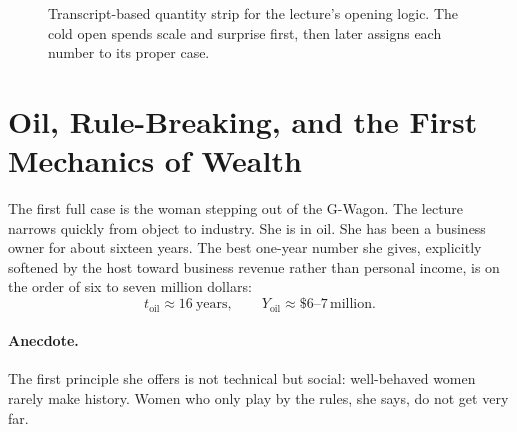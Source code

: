 \begin{figure}[h]
\centering
{}
\caption{Transcript-based quantity strip for the lecture's opening logic. The cold open spends scale and surprise first, then later assigns each number to its proper case.}
\end{figure}

\section{Oil, Rule-Breaking, and the First Mechanics of Wealth}

The first full case is the woman stepping out of the G-Wagon. The lecture narrows quickly from object to industry. She is in oil. She has been a business owner for about sixteen years. The best one-year number she gives, explicitly softened by the host toward business revenue rather than personal income, is on the order of six to seven million dollars:
\begin{equation}
t_{\text{oil}} \approx 16\ \text{years},
\qquad
Y_{\text{oil}} \approx \$6\text{--}7\,\text{million}.
\end{equation}

\paragraph{Anecdote.}
The first principle she offers is not technical but social: well-behaved women rarely make history. Women who only play by the rules, she says, do not get very far.

